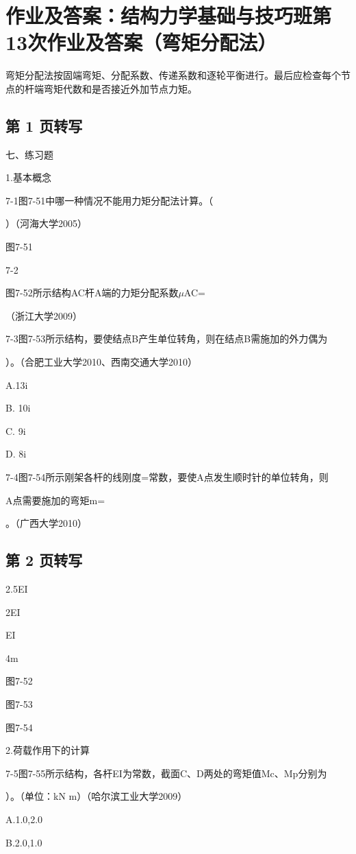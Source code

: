 \section{作业及答案：结构力学基础与技巧班第13次作业及答案（弯矩分配法）}
\begin{analysisbox}
弯矩分配法按固端弯矩、分配系数、传递系数和逐轮平衡进行。最后应检查每个节点的杆端弯矩代数和是否接近外加节点力矩。
\end{analysisbox}
\subsection*{第 1 页转写}
七、练习题

1.基本概念

7-1图7-51中哪一种情况不能用力矩分配法计算。（

）（河海大学2005）

图7-51

7-2

图7-52所示结构AC杆A端的力矩分配系数$\mu$AC=

（浙江大学2009）

7-3图7-53所示结构，要使结点B产生单位转角，则在结点B需施加的外力偶为

）。（合肥工业大学2010、西南交通大学2010）

A.13i

B. 10i

C. 9i

D. 8i

7-4图7-54所示刚架各杆的线刚度=常数，要使A点发生顺时针的单位转角，则

A点需要施加的弯矩m=

。（广西大学2010）

\subsection*{第 2 页转写}
2.5EI

2EI

EI

4m

图7-52

图7-53

图7-54

2.荷载作用下的计算

7-5图7-55所示结构，各杆EI为常数，截面C、D两处的弯矩值Mc、Mp分别为

）。（单位：kN m）（哈尔滨工业大学2009）

A.1.0,2.0

B.2.0,1.0

